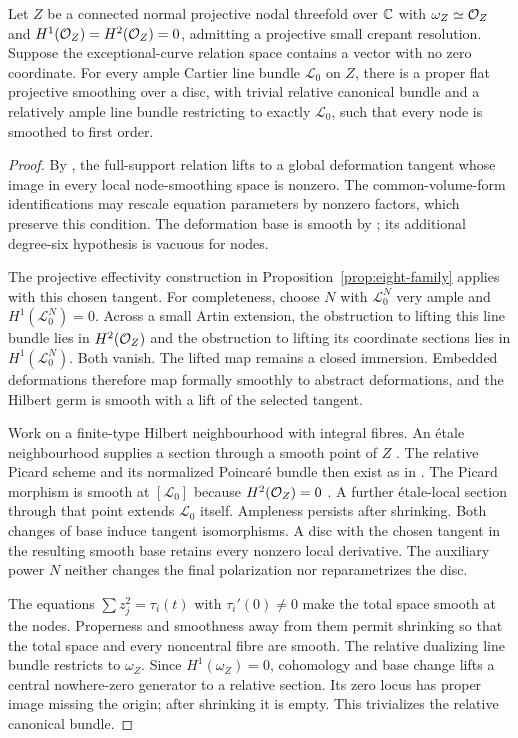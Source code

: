 \begin{lemma}\label{lem:polarized-nodal-family}
Let $Z$ be a connected normal projective nodal threefold over $\mathbb C$
with $\omega_Z\simeq\mathcal O_Z$ and
$H^1(\mathcal O_Z)=H^2(\mathcal O_Z)=0$, admitting a projective small crepant
resolution. Suppose the exceptional-curve relation space contains a
vector with no zero coordinate. For every ample Cartier line bundle
$\mathcal L_0$ on $Z$, there is a proper flat projective smoothing
over a disc, with trivial relative canonical bundle and a relatively
ample line bundle restricting to exactly $\mathcal L_0$, such that
every node is smoothed to first order.
\end{lemma}
\begin{proof}
By \cite[Theorem~2.5]{wuebben-cy-smoothing}, the full-support relation
lifts to a global deformation tangent whose image in every local
node-smoothing space is nonzero. The common-volume-form
identifications may rescale equation parameters by nonzero factors,
which preserve this condition. The deformation base is smooth by
\cite[Theorem~4.5]{wuebben-cy-smoothing}; its additional degree-six
hypothesis is vacuous for nodes.

The projective effectivity construction in
Proposition~\ref{prop:eight-family} applies with this chosen tangent.
For completeness, choose $N$ with $\mathcal L_0^N$ very ample and
$H^1(\mathcal L_0^N)=0$. Across a small Artin extension, the
obstruction to lifting this line bundle lies in $H^2(\mathcal O_Z)$ and
the obstruction to lifting its coordinate sections lies in
$H^1(\mathcal L_0^N)$. Both vanish. The lifted map remains a closed
immersion. Embedded deformations therefore map formally smoothly to
abstract deformations, and the Hilbert germ is smooth with a lift of
the selected tangent.

Work on a finite-type Hilbert neighbourhood with integral fibres.
An \'etale neighbourhood supplies a section through a smooth point of
$Z$ \cite[Lemma~37.38.5, Tag~057G]{stacks}. The relative Picard
scheme and its normalized Poincar\'e bundle then exist as in
\cite[Theorems~2.5(2), 4.8 and Exercise~4.3]{kleiman-picard}.
The Picard morphism is smooth at $[\mathcal L_0]$ because
$H^2(\mathcal O_Z)=0$ \cite[Proposition~5.19]{kleiman-picard}.
A further \'etale-local section through that point extends
$\mathcal L_0$ itself. Ampleness persists after shrinking.
Both changes of base induce tangent isomorphisms. A disc with the
chosen tangent in the resulting smooth base retains every nonzero
local derivative. The auxiliary power $N$ neither changes the final
polarization nor reparametrizes the disc.

The equations $\sum z_j^2=\tau_i(t)$ with $\tau_i'(0)\ne0$
make the total space smooth at the nodes. Properness and smoothness
away from them permit shrinking so that the total space and every
noncentral fibre are smooth. The relative dualizing line bundle
restricts to $\omega_Z$. Since $H^1(\omega_Z)=0$, cohomology and
base change lifts a central nowhere-zero generator to a relative
section. Its zero locus has proper image missing the origin; after
shrinking it is empty. This trivializes the relative canonical bundle.
\end{proof}

